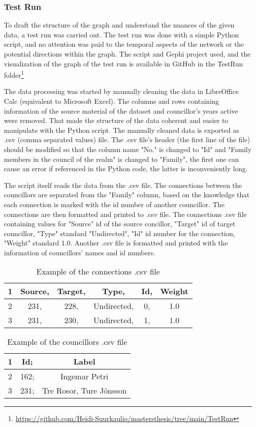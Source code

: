\subsubsection{Test Run}
To draft the structure of the graph and understand the nuances of the given data, a test run was carried out. The test run was done with a simple Python script, and no attention was paid to the temporal aspects of the network or the potential directions within the graph. The script and Gephi project used, and the visualization of the graph of the test run is available in GitHub in the TestRun folder\footnote{\url{https://github.com/Heidi-Suurkaulio/mastersthesis/tree/main/TestRun}}

The data processing was started by manually cleaning the data in LibreOffice Calc (equivalent to Microsoft Excel). The columns and rows containing information of the source material of the dataset and councillor's years active were removed. That made the structure of the data coherent and easier to manipulate with the Python script. The manually cleaned data is exported as .csv (comma separated values) file. The .csv file's header (the first line of the file) should be modified so that the column name "No." is changed to "Id" and "Family members in the council of the realm" is changed to "Family", the first one can cause an error if referenced in the Python code, the latter is inconveniently long.

The script itself reads the data from the .csv file. The connections between the councillors are separated from the "Family" column, based on the knowledge that each connection is marked with the id number of another councillor. The connections are then formatted and printed to .csv file. The connections .csv file containing values for "Source" id of the source concillor, "Target" id of target councillor, "Type" standard "Undirected", "Id" id number for the connection, "Weight" standard 1.0. Another .csv file is formatted and printed with the information of councillors' names and id numbers.

\begin{table}[h]
	\caption{Example of the connections .csv file}
	\centering
	\begin{tabular}{cccccc}
		\hline
		1 &Source, &Target, &Type, &Id, &Weight \\
		\hline
		2 &231, &228, &Undirected, &0, &1.0 \\
		\hline
		3 &231, &230, &Undirected, &1, &1.0 \\
		\hline
	\end{tabular}
\end{table}
\begin{table}[h]
	\caption{Example of the councillors .csv file}
	\centering
	\begin{tabular}{ccc}	
		\hline
		1 &Id; &Label \\
		\hline
		2 &162; &Ingemar Petri \\
		\hline
		3 &231; &Tre Rosor, Ture Jönsson \\
		\hline
	\end{tabular}
\end{table}

